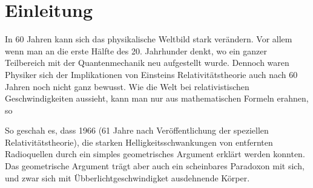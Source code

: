\section{Einleitung}
\label{sec:einleitung}
In 60 Jahren kann sich das physikalische Weltbild stark verändern. Vor allem wenn man an die erste Hälfte des 20. Jahrhunder denkt, wo ein ganzer Teilbereich mit der Quantenmechanik neu aufgestellt wurde. Dennoch waren Physiker sich der Implikationen von Einsteins  Relativitätstheorie auch nach 60 Jahren noch nicht ganz bewusst. Wie die Welt bei relativistischen Geschwindigkeiten aussieht, kann man nur aus mathematischen Formeln erahnen, so 

So geschah es, dass 1966 (61 Jahre nach Veröffentlichung der speziellen Relativitätstheorie), die starken Helligkeitsschwankungen von entfernten Radioquellen durch ein simples geometrisches Argument erklärt werden konnten. 
Das geometrische Argument trägt aber auch ein scheinbares Paradoxon mit sich, und zwar sich mit Übberlichtgeschwindigket ausdehnende Körper.